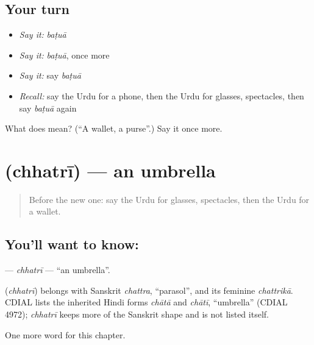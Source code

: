\subsection*{Your turn}
\begin{itemize}
\raggedright
  \item \emph{Say it:} \emph{baṭuā}
  \item \emph{Say it:} \emph{baṭuā}, once more
  \item \emph{Say it:} say \emph{baṭuā}
  \item \emph{Recall:} say the Urdu for a phone, then the Urdu for glasses, spectacles, then say \emph{baṭuā} again
\end{itemize}

\begin{tcolorbox}[breakable,colback=teal!4,colframe=teal!35!black,title={Before you move on}]
What does  mean? (\textquotedblleft{}A wallet, a purse\textquotedblright{}.) Say it once more.
\end{tcolorbox}
\section[\texorpdfstring{\ur{چھتری} (chhatrī)}{چھتری (chhatrī)}]{ (chhatrī) — an umbrella}

\label{lesson:UR-C111-chhatri}



\begin{quote}
Before the new one: say the Urdu for glasses, spectacles, then the Urdu for a wallet.
\end{quote}

\subsection*{You'll want to know: }
\textbf{} — \emph{chhatrī} — \textquotedblleft{}an umbrella\textquotedblright{}.

\begin{cousinweb}
\textbf{} (\emph{chhatrī}) belongs with Sanskrit \emph{chattra}, \textquotedblleft{}parasol\textquotedblright{}, and its feminine \emph{chattrikā}. CDIAL lists the inherited Hindi forms \emph{chātā} and \emph{chātī}, \textquotedblleft{}umbrella\textquotedblright{} (CDIAL 4972); \emph{chhatrī} keeps more of the Sanskrit shape and is not listed itself.
\end{cousinweb}

\begin{grammarlens}[title={What you've built}]
One more word for this chapter.
\end{grammarlens}

